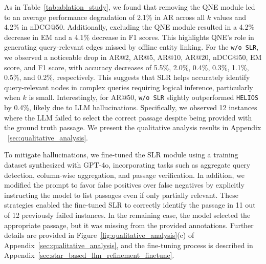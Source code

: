 As in Table~\ref{tab:ablation_study},
we found that removing the QNE module led to an average performance degradation of 2.1\% in AR across all $k$ values and 4.2\% in nDCG@50.
Additionally, excluding the QNE module resulted in a 4.2\% decrease in EM and a 4.1\% decrease in F1 scores.
This highlights QNE’s role in generating query-relevant edges missed by offline entity linking.
For the \texttt{w/o SLR}, we observed a noticeable drop in AR@2, AR@5, AR@10, AR@20, nDCG@50, EM score, and F1 score, with accuracy decreases of 5.5\%, 2.0\%, 0.4\%, 0.3\%, 1.1\%, 0.5\%, and 0.2\%, respectively.
This suggests that SLR helps accurately identify query-relevant nodes in complex queries requiring logical inference, particularly when $k$ is small.
Interestingly, for AR@50, \texttt{w/o SLR} slightly outperformed \texttt{HELIOS} by 0.4\%, likely due to LLM hallucinations.
Specifically, we observed 12 instances where the LLM failed to select the correct passage despite being provided with the ground truth passage.
We present the qualitative analysis results in Appendix \textsection~\ref{sec:qualitative_analysis}.


To mitigate hallucinations, we fine-tuned the SLR module using a training dataset synthesized with GPT-4o, incorporating tasks such as aggregate query detection, column-wise aggregation, and passage verification. 
In addition, we modified the prompt to favor false positives over false negatives by explicitly instructing the model to list passages even if only partially relevant. 
These strategies enabled the fine-tuned SLR to correctly identify the passage in 11 out of 12 previously failed instances. 
In the remaining case, the model selected the appropriate passage, but it was missing from the provided annotations. Further details are provided in Figure~\ref{fig:qualitative_analysis}(c) of Appendix~\textsection\ref{sec:qualitative_analysis}, and the fine-tuning process is described in Appendix~\textsection\ref{sec:star_based_llm_refinement_finetune}.




























